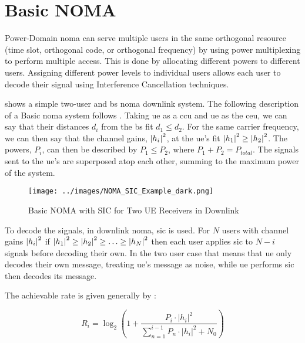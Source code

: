 \section{Basic NOMA}
Power-Domain \ac{noma} can serve multiple users in the same orthogonal resource
(time slot, orthogonal code, or orthogonal frequency)
by using power multiplexing to perform multiple access.
This is done by allocating different powers to different users.
\cite{ding:2017}
Assigning different power levels to individual users allows each user to decode their signal using Interference Cancellation techniques.

\par
{} shows a simple two-user and \ac{bs} \ac{noma} downlink system.
The following description of a Basic \ac{noma} system follows \cite{saito:2013,shahab:2018,ding:2017}.
Taking \ac{ue} as a \ac{ccu} and \ac{ue} as the \ac{ceu}, we can say that their distances $d_i$ from the \ac{bs} fit $d_1 \leq d_2$.
For the same carrier frequency, we can then say that the channel gains, $\abs{h_i}^2$, at the \ac{ue}'s fit
$\abs{h_1}^2 \geq \abs{h_2}^2$.
The powers, $P_i$, can then be described by $P_1 \leq P_2$, where $P_1 + P_2 = P_{total}$.
The signals sent to the \ac{ue}'s are superposed atop each other, summing to the maximum power of the system.

\begin{figure}[htb]
	\centering
	\texttt{[image: ../images/NOMA\_SIC\_Example\_dark.png]}
	\caption{Basic NOMA with SIC for Two UE Receivers in Downlink}
	\label{fig:basicnoma}
\end{figure}

\par
To decode the signals, in downlink \ac{noma}, \ac{sic} is used.
For $N$ users with channel gains $\abs{h_i}^2$ if
$\abs{h_1}^2 \geq \abs{h_2}^2 \geq \ldots \geq \abs{h_N}^2$
then each user applies \ac{sic} to
$N-i$ signals before decoding their own.
In the two user case that means that \ac{ue} only decodes their own message, treating \ac{ue}'s message as noise, while \ac{ue} performs \ac{sic} then decodes its message.

\par
The achievable rate is given generally by :

\begin{equation}
	R_i = \log_2 
	\left(
	1 +
	\frac{P_i \cdot \left| h_i \right| ^2}
	{\sum_{n=1}^{i-1}P_{n} \cdot \left| h_i \right| ^2 + N_0}
	\right)
	\label{eq:nomagen}
\end{equation}

